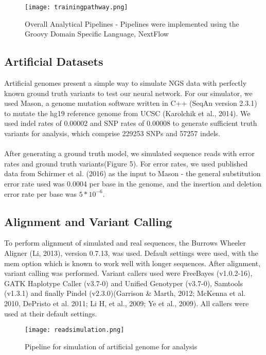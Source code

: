 \documentclass{article}
\begin{document}
\begin{figure}[H]
\texttt{[image: trainingpathway.png]}
\centering
\caption{Overall Analytical Pipelines - Pipelines were implemented using the Groovy Domain Specific Language, NextFlow}
\end{figure}

\subsection{Artificial Datasets}
Artificial genomes present a simple way to simulate NGS data with perfectly known ground truth variants to test our neural network. For our simulator, we used Mason, a genome mutation software written in C++ (SeqAn version 2.3.1) to mutate the hg19 reference genome from UCSC (Karolchik et al., 2014). We used indel rates of 0.00002 and SNP rates of 0.00008 to generate sufficient truth variants for analysis, which comprise 229253 SNPs and 57257 indels.\\\\
After generating a ground truth model, we simulated sequence reads with error rates and ground truth variants(Figure 5). For error rates, we used published data from Schirmer et al. (2016) as the input to Mason - the general substitution error rate used was 0.0004 per base in the genome, and the insertion and deletion error rate per base was $5*10^{-6}$.

\subsection{Alignment and Variant Calling} 
To perform alignment of simulated and real sequences, the Burrows Wheeler Aligner (Li, 2013), version 0.7.13, was used. Default settings were used, with the mem option which is known to work well with longer sequences. After alignment, variant calling was performed. Variant callers used were FreeBayes (v1.0.2-16), GATK Haplotype Caller (v3.7-0) and Unified Genotyper (v3.7-0), Samtools (v1.3.1) and finally Pindel (v2.3.0)(Garrison \& Marth, 2012; McKenna et al. 2010, DePristo et al. 2011; Li H, et al., 2009; Ye et al., 2009). All callers were used at their default settings.
\begin{figure}[H]
\texttt{[image: readsimulation.png]}
\caption{Pipeline for simulation of artificial genome for analysis}
\centering
\end{figure}
\end{document}
